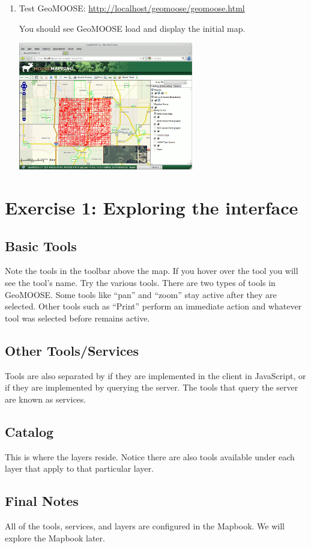 \documentclass[letterpaper]{article}
\begin{document}
\begin{enumerate}
\item Test GeoMOOSE: \url{http://localhost/geomoose/geomoose.html}

  You should see GeoMOOSE load and display the initial map.
  \begin{center}
    \includegraphics[width=3in]{images/00-geomoose.png}
  \end{center}
\end{enumerate}

\section*{Exercise 1: Exploring the interface}
\subsection*{Basic Tools}
Note the tools in the toolbar above the map.  If you hover over the
tool you will see the tool's name.  Try the various tools.  There are
two types of tools in GeoMOOSE.  Some tools like ``pan'' and ``zoom''
stay active after they are selected.  Other tools such as ``Print''
perform an immediate action and whatever tool was selected before
remains active.
 
\subsection*{Other Tools/Services}
Tools are also separated by if they are implemented in the client in
JavaScript, or if they are implemented by querying the server.  The
tools that query the server are known as services.

\subsection*{Catalog}
This is where the layers reside.  Notice there are also tools
available under each layer that apply to that particular layer.

\subsection*{Final Notes}
All of the tools, services, and layers are configured in the
Mapbook.  We will explore the Mapbook later.
\end{document}
